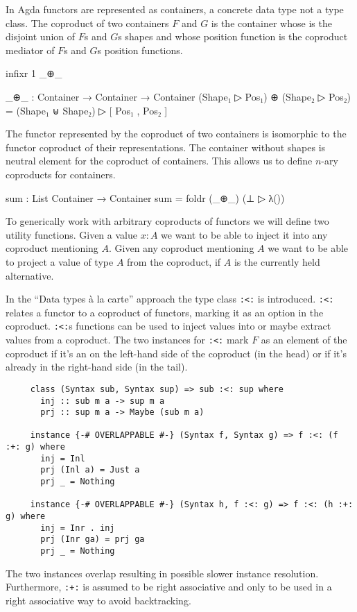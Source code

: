 In Agda functors are represented as containers, a concrete data type not a type
class.
The coproduct of two containers $F$ and $G$ is the container whose
 is the disjoint union of $F$s and $G$s shapes and whose
position function  is the coproduct mediator of $F$s and $G$s
position functions.

\begin{code}[hide]
infixr 1 _⊕_
\end{code}
\begin{code}
_⊕_ : Container → Container → Container
(Shape₁ ▷ Pos₁) ⊕ (Shape₂ ▷ Pos₂) = (Shape₁ ⊎ Shape₂) ▷ [ Pos₁ , Pos₂ ]
\end{code}
The functor represented by the coproduct of two containers is isomorphic to the
functor coproduct of their representations.
The container without shapes is neutral element for the coproduct of containers.
This allows us to define $n$-ary coproducts for containers.

\begin{code}
sum : List Container → Container
sum  = foldr (_⊕_) (⊥ ▷ λ())
\end{code}
To generically work with arbitrary coproducts of functors we will define two
utility functions.
Given a value $x:A$ we want to be able to inject it into any coproduct
mentioning $A$.
Given any coproduct mentioning $A$ we want to be able to project a value of
type $A$ from the coproduct, if $A$ is the currently held alternative.

In the ``Data types {\`{a}} la carte''\cite{DBLP:journals/jfp/Swierstra08}
approach the type class \texttt{:<:} is introduced.
\texttt{:<:} relates a functor to a coproduct of functors, marking it as an
option in the coproduct.
\texttt{:<:}s functions can be used to inject values into or maybe extract
values from a coproduct.
The two instances for \texttt{:<:} mark $F$ as an element of the coproduct if
it's an on the left-hand side of the coproduct (in the head) or if it's already
in the right-hand side (in the tail).

\begin{verbatim}
     class (Syntax sub, Syntax sup) => sub :<: sup where
       inj :: sub m a -> sup m a
       prj :: sup m a -> Maybe (sub m a)

     instance {-# OVERLAPPABLE #-} (Syntax f, Syntax g) => f :<: (f :+: g) where
       inj = Inl
       prj (Inl a) = Just a
       prj _ = Nothing

     instance {-# OVERLAPPABLE #-} (Syntax h, f :<: g) => f :<: (h :+: g) where
       inj = Inr . inj
       prj (Inr ga) = prj ga
       prj _ = Nothing
\end{verbatim}
The two instances overlap resulting in possible slower instance resolution.
Furthermore, \texttt{:+:} is assumed to be right associative and only to be
used in a right associative way to avoid backtracking.

